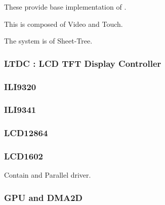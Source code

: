 

These provide base implementation of .

This is composed of Video and Touch.

The system is of Sheet-Tree.



\subsubsection{LTDC : LCD TFT Display Controller}



\subsubsection{ILI9320}



\subsubsection{ILI9341}



\subsubsection{LCD12864}



\subsubsection{LCD1602}

Contain  and Parallel driver.



\subsubsection{GPU and DMA2D}

